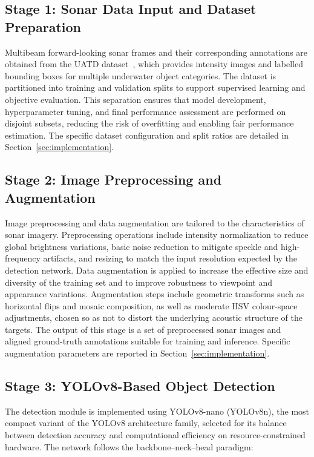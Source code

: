 \documentclass[conference]{IEEEtran}
\begin{document}
\subsection{Stage 1: Sonar Data Input and Dataset Preparation}

Multibeam forward-looking sonar frames and their corresponding annotations are obtained from the UATD dataset~\cite{ref10}, which provides intensity images and labelled bounding boxes for multiple underwater object categories. The dataset is partitioned into training and validation splits to support supervised learning and objective evaluation. This separation ensures that model development, hyperparameter tuning, and final performance assessment are performed on disjoint subsets, reducing the risk of overfitting and enabling fair performance estimation. The specific dataset configuration and split ratios are detailed in Section~\ref{sec:implementation}.

\subsection{Stage 2: Image Preprocessing and Augmentation}

Image preprocessing and data augmentation are tailored to the characteristics of sonar imagery. Preprocessing operations include intensity normalization to reduce global brightness variations, basic noise reduction to mitigate speckle and high-frequency artifacts, and resizing to match the input resolution expected by the detection network. Data augmentation is applied to increase the effective size and diversity of the training set and to improve robustness to viewpoint and appearance variations. Augmentation steps include geometric transforms such as horizontal flips and mosaic composition, as well as moderate HSV colour-space adjustments, chosen so as not to distort the underlying acoustic structure of the targets. The output of this stage is a set of preprocessed sonar images and aligned ground-truth annotations suitable for training and inference. Specific augmentation parameters are reported in Section~\ref{sec:implementation}.

\subsection{Stage 3: YOLOv8-Based Object Detection}

The detection module is implemented using YOLOv8-nano (YOLOv8n), the most compact variant of the YOLOv8 architecture family, selected for its balance between detection accuracy and computational efficiency on resource-constrained hardware. The network follows the backbone--neck--head paradigm:
\end{document}
